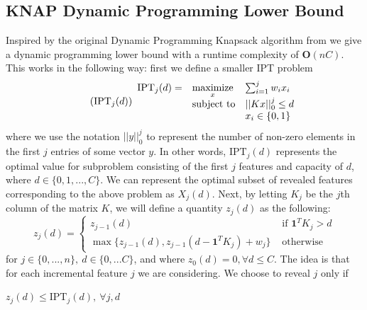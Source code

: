 \documentclass[12pt]{article}
\newcommand{\priv}{\text{IPT}}
\begin{document}
\subsection{\gls{KNAP} Dynamic Programming Lower Bound}
Inspired by the original Dynamic Programming Knapsack algorithm from \cite{KelPfePis04} we give a dynamic programming lower bound with a runtime complexity of $\mathbf{O}(n C)$. This works in the following way: first we define a smaller \gls{IPT} problem 
\begin{equation}
	\label{eq:priv_j} 
    \tag{$\text{IPT}_j(d)$} 
	\begin{array}{lll}
		\priv_j(d) = & \underset{x}{\text{maximize}} & \sum_{i=1}^j w_i x_i \\
		& \mbox{subject to} & ||K x||_{0}^j  \leq d \\
        && x_i \in \{0,1\}
		\end{array}
\end{equation}
where we use the notation $||y||_0^j$ to represent the number of non-zero elements in the first $j$ entries of some vector $y$. In other words, $\priv_j(d)$ represents the optimal value for subproblem consisting of the first $j$ features and capacity of $d$, where $d \in \{0,1,...,C\}$. We can represent the optimal subset of revealed features corresponding to the above problem as $X_j(d)$. Next, by letting $K_j$ be the $j$th column of the matrix $K$, we will define a quantity $z_j(d)$ as the following:
\[ z_j(d) = \begin{cases}
    z_{j-1}(d) & \text{ if } \mathbf{1}^T K_{j} > d \\
    \max\{z_{j-1}(d), z_{j-1}(d- \mathbf{1}^T K_{j}) + w_j\} & \text{ otherwise}
\end{cases}
\]
for $j \in \{0,...,n\}, \ d \in \{0,...C\}$, and where $z_0(d) = 0, \forall d \leq C$. The idea is that for each incremental feature $j$ we are considering. We choose to reveal $j$ only if  
\begin{theorem}
    $z_j(d) \leq \priv_j(d), \ \forall j,d$
\end{theorem}
\end{document}
